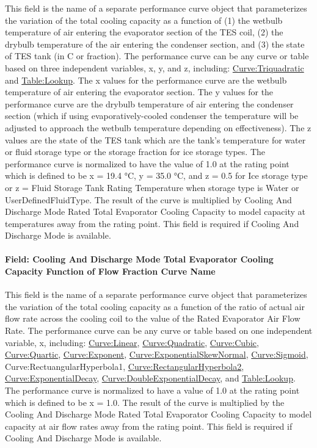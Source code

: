This field is the name of a separate performance curve object that parameterizes the variation of the total cooling capacity as a function of (1) the wetbulb temperature of air entering the evaporator section of the TES coil, (2) the drybulb temperature of the air entering the condenser section, and (3) the state of TES tank (in C or fraction). The performance curve can be any curve or table based on three independent variables, x, y, and z, including: \hyperref[curvetriquadratic]{Curve:Triquadratic} and \hyperref[tablelookup]{Table:Lookup}. The x values for the performance curve are the wetbulb temperature of air entering the evaporator section. The y values for the performance curve are the drybulb temperature of air entering the condenser section (which if using evaporatively-cooled condenser the temperature will be adjusted to approach the wetbulb temperature depending on effectiveness). The z values are the state of the TES tank which are the tank's temperature for water or fluid storage type or the storage fraction for ice storage types. The performance curve is normalized to have the value of 1.0 at the rating point which is defined to be x = 19.4 °C, y = 35.0 °C, and z = 0.5 for Ice storage type or z = Fluid Storage Tank Rating Temperature when storage type is Water or UserDefinedFluidType. The result of the curve is multiplied by Cooling And Discharge Mode Rated Total Evaporator Cooling Capacity to model capacity at temperatures away from the rating point. This field is required if Cooling And Discharge Mode is available.

\paragraph{Field: Cooling And Discharge Mode Total Evaporator Cooling Capacity Function of Flow Fraction Curve Name}\label{field-cooling-and-discharge-mode-total-evaporator-cooling-capacity-function-of-flow-fraction-curve-name}

This field is the name of a separate performance curve object that parameterizes the variation of the total cooling capacity as a function of the ratio of actual air flow rate across the cooling coil to the value of the Rated Evaporator Air Flow Rate. The performance curve can be any curve or table based on one independent variable, x, including: \hyperref[curvelinear]{Curve:Linear}, \hyperref[curvequadratic]{Curve:Quadratic}, \hyperref[curvecubic]{Curve:Cubic}, \hyperref[curvequartic]{Curve:Quartic}, \hyperref[curveexponent]{Curve:Exponent}, \hyperref[curveexponentialskewnormal]{Curve:ExponentialSkewNormal}, \hyperref[curvesigmoid]{Curve:Sigmoid}, Curve:RectuangularHyperbola1, \hyperref[curverectangularhyperbola2]{Curve:RectangularHyperbola2}, \hyperref[curveexponentialdecay]{Curve:ExponentialDecay}, \hyperref[curvedoubleexponentialdecay]{Curve:DoubleExponentialDecay}, and \hyperref[tablelookup]{Table:Lookup}. The performance curve is normalized to have a value of 1.0 at the rating point which is defined to be x = 1.0. The result of the curve is multiplied by the Cooling And Discharge Mode Rated Total Evaporator Cooling Capacity to model capacity at air flow rates away from the rating point. This field is required if Cooling And Discharge Mode is available.

